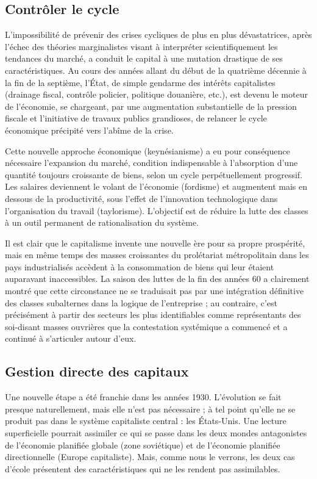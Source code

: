 \subsection{Contrôler le cycle}

L'impossibilité de prévenir des crises cycliques de plus en plus dévastatrices, après l'échec des théories marginalistes visant à interpréter scientifiquement les tendances du marché, a conduit le capital à une mutation drastique de ses caractéristiques. Au cours des années allant du début de la quatrième décennie à la fin de la septième, l'État, de simple gendarme des intérêts capitalistes (drainage fiscal, contrôle policier, politique douanière, etc.), est devenu le moteur de l'économie, se chargeant, par une augmentation substantielle de la pression fiscale et l’initiative de travaux publics grandioses, de relancer le cycle économique précipité vers l'abîme de la crise.

Cette nouvelle approche économique (keynésianisme) a eu pour conséquence nécessaire l'expansion du marché, condition indispensable à l'absorption d'une quantité toujours croissante de biens, selon un cycle perpétuellement progressif. Les salaires deviennent le volant de l'économie (fordisme) et augmentent mais en dessous de la productivité, sous l'effet de l'innovation technologique dans l'organisation du travail (taylorisme). L'objectif est de réduire la lutte des classes à un outil permanent de rationalisation du système.

Il est clair que le capitalisme invente une nouvelle ère pour sa propre prospérité, mais en même temps des masses croissantes du prolétariat métropolitain dans les pays industrialisés accèdent à la consommation de biens qui leur étaient auparavant inaccessibles. La saison des luttes de la fin des années 60 a clairement montré que cette circonstance ne se traduisait pas par une intégration définitive des classes subalternes dans la logique de l'entreprise ; au contraire, c'est précisément à partir des secteurs les plus identifiables comme représentants des soi-disant masses ouvrières que la contestation systémique a commencé et a continué à s'articuler autour d'eux.

\subsection{Gestion directe des capitaux}

Une nouvelle étape a été franchie dans les années 1930. L'évolution se fait presque naturellement, mais elle n'est pas nécessaire ; à tel point qu'elle ne se produit pas dans le système capitaliste central : les États-Unis. Une lecture superficielle pourrait assimiler ce qui se passe dans les deux mondes antagonistes de l'économie planifiée globale (zone soviétique) et de l'économie planifiée directionnelle (Europe capitaliste). Mais, comme nous le verrons, les deux cas d'école présentent des caractéristiques qui ne les rendent pas assimilables.

